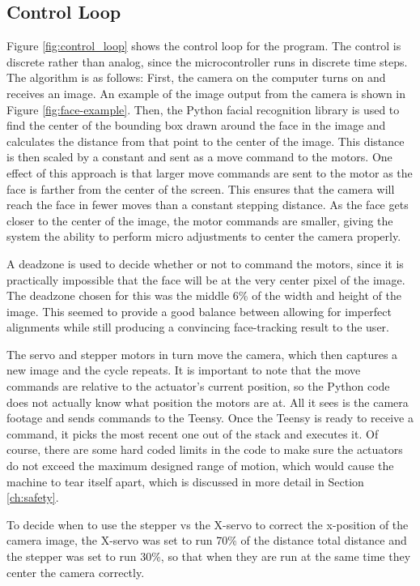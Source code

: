 \subsection{Control Loop}
Figure \ref{fig:control_loop} shows the control loop for the program. The control is discrete rather than analog, since the microcontroller runs in discrete time steps. The algorithm is as follows: First, the camera on the computer turns on and receives an image. An example of the image output from the camera is shown in Figure \ref{fig:face-example}. Then, the Python facial recognition library is used to find the center of the bounding box drawn around the face in the image and calculates the distance from that point to the center of the image. This distance is then scaled by a constant and sent as a move command to the motors. One effect of this approach is that larger move commands are sent to the motor as the face is farther from the center of the screen. This ensures that the camera will reach the face in fewer moves than a constant stepping distance. As the face gets closer to the center of the image, the motor commands are smaller, giving the system the ability to perform micro adjustments to center the camera properly.

A deadzone is used to decide whether or not to command the motors, since it is practically impossible that the face will be at the very center pixel of the image. The deadzone chosen for this was the middle 6\% of the width and height of the image. This seemed to provide a good balance between allowing for imperfect alignments while still producing a convincing face-tracking result to the user.

The servo and stepper motors in turn move the camera, which then captures a new image and the cycle repeats. It is important to note that the move commands are relative to the actuator's current position, so the Python code does not actually know what position the motors are at. All it sees is the camera footage and sends commands to the Teensy. Once the Teensy is ready to receive a command, it picks the most recent one out of the stack and executes it. Of course, there are some hard coded limits in the code to make sure the actuators do not exceed the maximum designed range of motion, which would cause the machine to tear itself apart, which is discussed in more detail in Section \ref{ch:safety}.

To decide when to use the stepper vs the X-servo to correct the x-position of the camera image, the X-servo was set to run 70\% of the distance total distance and the stepper was set to run 30\%, so that when they are run at the same time they center the camera correctly.

